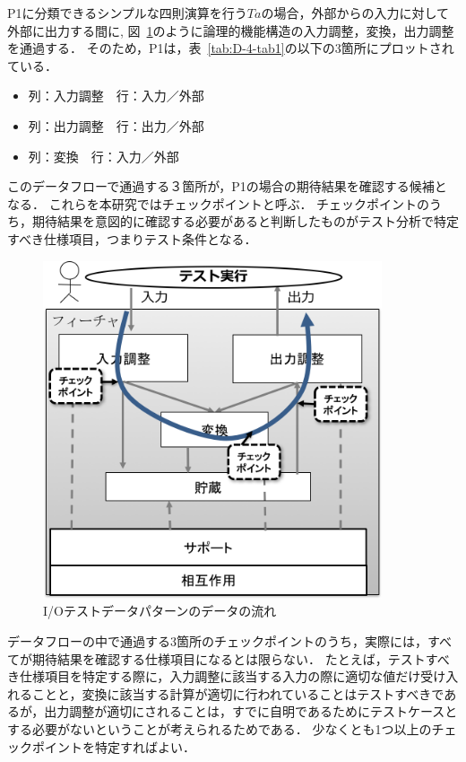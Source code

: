 P1に分類できるシンプルな四則演算を行う$Ta$の場合，外部からの入力に対して外部に出力する間に,
図~\ref{fig:D-4-Fig7}のように論理的機能構造の入力調整，変換，出力調整を通過する．
そのため，P1は，表~\ref{tab:D-4-tab1}の以下の3箇所にプロットされている．
\begin{itemize}
  \item 列：入力調整　行：入力／外部
  \item 列：出力調整　行：出力／外部
  \item 列：変換　行：入力／外部
\end{itemize}

このデータフローで通過する３箇所が，P1の場合の期待結果を確認する候補となる．
これらを本研究ではチェックポイントと呼ぶ．
チェックポイントのうち，期待結果を意図的に確認する必要があると判断したものがテスト分析で特定すべき仕様項目，つまりテスト条件となる．

 \begin{figure}[htbp]
 \begin{center}
 \includegraphics[width=10cm]{./image/D-4-Fig7.png}
 \caption{I/Oテストデータパターンのデータの流れ}
 \label{fig:D-4-Fig7}
 \end{center}
 \end{figure}

データフローの中で通過する3箇所のチェックポイントのうち，実際には，すべてが期待結果を確認する仕様項目になるとは限らない．
たとえば，テストすべき仕様項目を特定する際に，入力調整に該当する入力の際に適切な値だけ受け入れることと，変換に該当する計算が適切に行われていることはテストすべきであるが，出力調整が適切にされることは，すでに自明であるためにテストケースとする必要がないということが考えられるためである．
少なくとも1つ以上のチェックポイントを特定すればよい．

